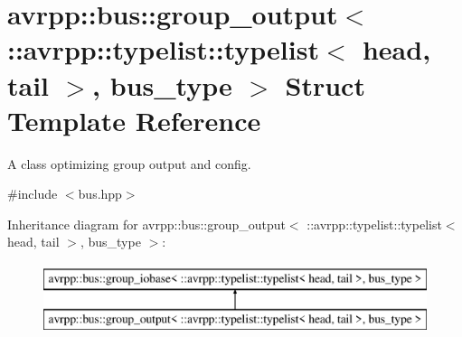 \hypertarget{structavrpp_1_1bus_1_1group__output_3_01_1_1avrpp_1_1typelist_1_1typelist_3_01head_00_01tail_01_4_00_01bus__type_01_4}{
\section{avrpp::bus::group\_\-output$<$ ::avrpp::typelist::typelist$<$ head, tail $>$, bus\_\-type $>$ Struct Template Reference}
\label{structavrpp_1_1bus_1_1group__output_3_01_1_1avrpp_1_1typelist_1_1typelist_3_01head_00_01tail_01_4_00_01bus__type_01_4}
}


A class optimizing group output and config.  




{\ttfamily \#include $<$bus.hpp$>$}

Inheritance diagram for avrpp::bus::group\_\-output$<$ ::avrpp::typelist::typelist$<$ head, tail $>$, bus\_\-type $>$:\begin{figure}[H]
\begin{center}
\leavevmode
\includegraphics[height=2.000000cm]{structavrpp_1_1bus_1_1group__output_3_01_1_1avrpp_1_1typelist_1_1typelist_3_01head_00_01tail_01_4_00_01bus__type_01_4}
\end{center}
\end{figure}
